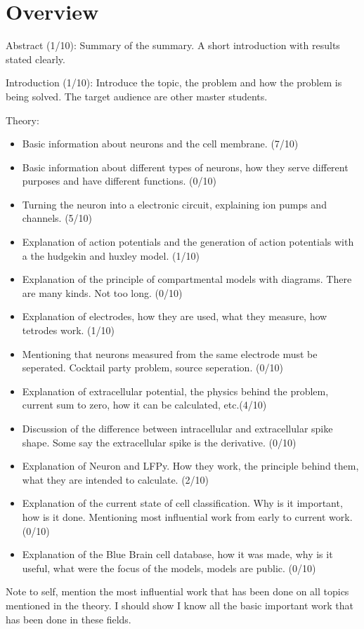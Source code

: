 \chapter*{Overview}

Abstract (1/10):
\newline
Summary of the summary. A short introduction with results stated clearly.
\newline

Introduction (1/10):
\newline
Introduce the topic, the problem and how the problem is being solved. 
The target audience are other master students. 
\newline 

Theory:
\begin{itemize}
    \setlength\itemsep{0pt}
    \item Basic information about neurons and the cell membrane. (7/10)
    \item Basic information about different types of neurons, how they serve
        different purposes and have different functions. (0/10)
    \item Turning the neuron into a electronic circuit, explaining ion pumps 
        and channels. (5/10)
    \item Explanation of action potentials and the generation of
        action potentials with a the hudgekin and huxley model. (1/10)
    \item Explanation of the principle of compartmental models with diagrams.
        There are many kinds. Not too long. (0/10)
    \item Explanation of electrodes, how they are used,
        what they measure, how tetrodes work. (1/10)
    \item Mentioning that neurons measured from the same electrode must
        be seperated. Cocktail party problem, source seperation. (0/10)
    \item Explanation of extracellular potential, the physics behind the
        problem, current sum to zero, how it can be calculated, etc.(4/10)
    \item Discussion of the difference between intracellular and extracellular 
        spike shape. Some say the extracellular spike is the derivative. (0/10)
    \item Explanation of Neuron and LFPy. How they work, the principle 
        behind them, what they are intended to calculate. (2/10)
    \item Explanation of the current state of cell classification.
        Why is it important, how is it done. Mentioning most influential 
        work from early to current work. (0/10)
    \item Explanation of the Blue Brain cell database, how it was made, 
        why is it useful, what were the focus of the models, models are public. (0/10)
\end{itemize}
\noindent 
Note to self, mention the most influential work that has been done on all
topics mentioned in the theory. I should show I know all the basic 
important work that has been done in these fields. 
\newline

